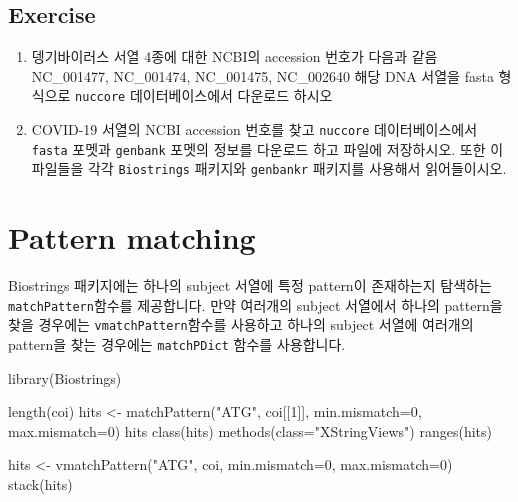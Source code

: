 \documentclass[
]{book}
\newenvironment{Shaded}{\begin{snugshade}}{\end{snugshade}}
\newcommand{\AttributeTok}[1]{\textcolor[rgb]{0.77,0.63,0.00}{#1}}
\newcommand{\DecValTok}[1]{\textcolor[rgb]{0.00,0.00,0.81}{#1}}
\newcommand{\FunctionTok}[1]{\textcolor[rgb]{0.00,0.00,0.00}{#1}}
\newcommand{\NormalTok}[1]{#1}
\newcommand{\OtherTok}[1]{\textcolor[rgb]{0.56,0.35,0.01}{#1}}
\newcommand{\StringTok}[1]{\textcolor[rgb]{0.31,0.60,0.02}{#1}}
\begin{document}
\hypertarget{day3-chapter06-rentrez-exercise}{%
\subsection{Exercise}\label{day3-chapter06-rentrez-exercise}}

\begin{enumerate}
\def\labelenumi{\arabic{enumi}.}
\item
  뎅기바이러스 서열 4종에 대한 NCBI의 accession 번호가 다음과 같음 NC\_001477, NC\_001474, NC\_001475, NC\_002640 해당 DNA 서열을 fasta 형식으로 \texttt{nuccore} 데이터베이스에서 다운로드 하시오
\item
  COVID-19 서열의 NCBI accession 번호를 찾고 \texttt{nuccore} 데이터베이스에서 \texttt{fasta} 포멧과 \texttt{genbank} 포멧의 정보를 다운로드 하고 파일에 저장하시오. 또한 이 파일들을 각각 \texttt{Biostrings} 패키지와 \texttt{genbankr} 패키지를 사용해서 읽어들이시오.
\end{enumerate}

\hypertarget{pattern-matching}{%
\section{Pattern matching}\label{pattern-matching}}

Biostrings 패키지에는 하나의 subject 서열에 특정 pattern이 존재하는지 탐색하는 \texttt{matchPattern}함수를 제공합니다. 만약 여러개의 subject 서열에서 하나의 pattern을 찾을 경우에는 \texttt{vmatchPattern}함수를 사용하고 하나의 subject 서열에 여러개의 pattern을 찾는 경우에는 \texttt{matchPDict} 함수를 사용합니다.

\begin{Shaded}
\begin{Highlighting}[]
\FunctionTok{library}\NormalTok{(Biostrings)}

\FunctionTok{length}\NormalTok{(coi)}
\NormalTok{hits }\OtherTok{\textless{}{-}} \FunctionTok{matchPattern}\NormalTok{(}\StringTok{"ATG"}\NormalTok{, coi[[}\DecValTok{1}\NormalTok{]], }\AttributeTok{min.mismatch=}\DecValTok{0}\NormalTok{, }\AttributeTok{max.mismatch=}\DecValTok{0}\NormalTok{)}
\NormalTok{hits}
\FunctionTok{class}\NormalTok{(hits)}
\FunctionTok{methods}\NormalTok{(}\AttributeTok{class=}\StringTok{"XStringViews"}\NormalTok{)}
\FunctionTok{ranges}\NormalTok{(hits)}

\NormalTok{hits }\OtherTok{\textless{}{-}} \FunctionTok{vmatchPattern}\NormalTok{(}\StringTok{"ATG"}\NormalTok{, coi, }\AttributeTok{min.mismatch=}\DecValTok{0}\NormalTok{, }\AttributeTok{max.mismatch=}\DecValTok{0}\NormalTok{)}
\FunctionTok{stack}\NormalTok{(hits)}
\end{Highlighting}
\end{Shaded}
\end{document}
